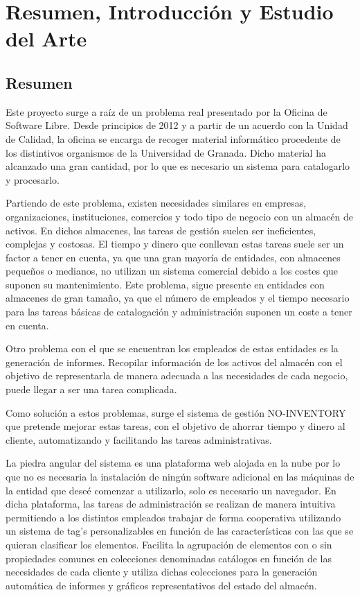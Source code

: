 \documentclass[a4paper,11pt]{book}
\begin{document}

%
\tableofcontents
\listoffigures

%

%


\chapter{Resumen, Introducción y Estudio del Arte}

\section{Resumen}

Este proyecto surge a raíz de un problema real presentado por la Oficina de Software Libre. Desde principios de 2012 y a partir de un acuerdo con la Unidad de Calidad, la oficina se encarga de recoger material informático procedente de los distintivos organismos de la Universidad de Granada. Dicho material ha alcanzado una gran cantidad, por lo que es necesario un sistema para catalogarlo y procesarlo. 

Partiendo de este problema, existen necesidades similares en empresas, organizaciones, instituciones, comercios y todo tipo de negocio con un almacén de activos.
En dichos almacenes, las tareas de gestión suelen ser ineficientes, complejas y costosas.  El tiempo y dinero que conllevan estas tareas suele ser un factor a tener en cuenta, ya que una gran mayoría de entidades, con almacenes pequeños o medianos, no utilizan un sistema comercial debido a los costes que suponen su mantenimiento. Este problema, sigue presente en entidades con almacenes de gran tamaño, ya que  el número de empleados y el tiempo necesario para las tareas básicas de catalogación y administración suponen un coste a tener en cuenta.

Otro problema con el que se encuentran los empleados de estas entidades es la generación de informes. Recopilar información de los activos del almacén con el objetivo de representarla de manera adecuada a las necesidades de cada negocio, puede llegar a ser una tarea complicada. 

Como solución a estos problemas, surge el sistema de gestión NO-INVENTORY que pretende mejorar estas tareas, con el objetivo de ahorrar tiempo y dinero al cliente, automatizando y facilitando las tareas administrativas.

La piedra angular del sistema es una plataforma web alojada en la nube por lo que no es necesaria la instalación de ningún software adicional en las máquinas de la entidad que deseé comenzar a utilizarlo, solo es necesario un navegador.  En dicha plataforma, las tareas de administración se realizan de manera intuitiva permitiendo a los distintos empleados trabajar de forma cooperativa utilizando un sistema de tag's personalizables en función de las características con las que se quieran clasificar los elementos. Facilita la agrupación de elementos con o sin propiedades comunes en colecciones denominadas catálogos en función de las necesidades de cada cliente y utiliza dichas colecciones para la generación automática de informes y gráficos representativos del estado del almacén. 
\end{document}

